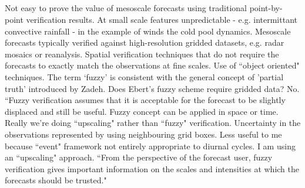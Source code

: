\documentclass[alpha-refs]{wiley-article}
\begin{document}
\subsection{\citet{ebert08}}
Not easy to prove the value of mesoscale forecasts using traditional point-by-point verification results. At small scale features unpredictable - e.g. intermittant convective rainfall - in the example of winds the cold pool dynamics. Mesoscale forecasts typically verified against high-resolution gridded datasets, e.g. radar mosaics or reanalysis. Spatial verification techniques that do not require the forecasts to exactly match the observations at fine scales. Use of ``object oriented" techniques. The term `fuzzy' is consistent with the general concept of 'partial truth' introduced by Zadeh. Does Ebert's fuzzy scheme require gridded data? No. ``Fuzzy verification assumes that it is acceptable for the forecast to be slightly displaced and still be useful. Fuzzy concept can be applied in space or time. Really we're doing ``upscaling" rather than ``fuzzy" verification. Uncertainty in the observations represented by using neighbouring grid boxes. Less useful to me because ``event" framework not entirely appropriate to diurnal cycles. I am using an ``upscaling" approach. ``From the perspective of the forecast user, fuzzy verification gives important information on the scales and intensities at which the forecasts should be trusted." 

\subsection{\citet{yates06}}
\end{document}
